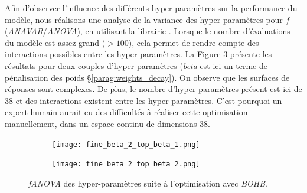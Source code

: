 % 
% 
% 

Afin d'observer l'influence des différents hyper-paramètres sur la performance du modèle, nous réalisons une analyse de la variance des hyper-paramètres pour $f$ (\textit{ANAVAR}/\textit{ANOVA}), en utilisant la librairie \citeauthor{hutter_efficient_2014} \cite{hutter_efficient_2014}.
Lorsque le nombre d'évaluations du modèle est assez grand ($> 100$), cela permet de rendre compte des interactions possibles entre les hyper-paramètres.
La Figure \ref{fig:fanova} présente les résultats pour deux couples d'hyper-paramètres (\textit{beta} est ici un terme de pénalisation des poids §\ref{parag:weights_decay}).
On observe que les surfaces de réponses sont complexes.
De plus, le nombre d'hyper-paramètres présent est ici de 38 et des interactions existent entre les hyper-paramètres.
C'est pourquoi un expert humain aurait eu des difficultés à réaliser cette optimisation manuellement, dans un espace continu de dimensions 38.

\begin{figure}[tbp]
    \centering
    \begin{subfigure}{.49\textwidth}
        \centering
        \texttt{[image: fine\_beta\_2\_top\_beta\_1.png]}
        \label{fig:fanova_a}
    \end{subfigure}\hfill%
    \begin{subfigure}{.49\textwidth}
        \centering
        \texttt{[image: fine\_beta\_2\_top\_beta\_2.png]}
        \label{fig:fanova_b}
    \end{subfigure}
    \caption{\textit{fANOVA} des hyper-paramètres suite à l'optimisation avec \textit{BOHB}.}
    \label{fig:fanova}
\end{figure}

